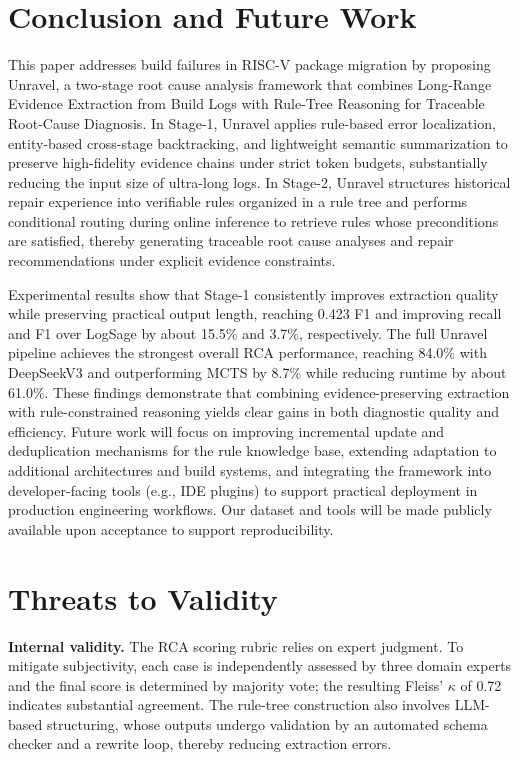 \documentclass[sigconf]{acmart}
\begin{document}
\section{Conclusion and Future Work}

This paper addresses build failures in RISC-V package migration by proposing Unravel, a two-stage root cause analysis framework that combines Long-Range Evidence Extraction from Build Logs with Rule-Tree Reasoning for Traceable Root-Cause Diagnosis. In Stage-1, Unravel applies rule-based error localization, entity-based cross-stage backtracking, and lightweight semantic summarization to preserve high-fidelity evidence chains under strict token budgets, substantially reducing the input size of ultra-long logs. In Stage-2, Unravel structures historical repair experience into verifiable rules organized in a rule tree and performs conditional routing during online inference to retrieve rules whose preconditions are satisfied, thereby generating traceable root cause analyses and repair recommendations under explicit evidence constraints.

Experimental results show that Stage-1 consistently improves extraction quality while preserving practical output length, reaching 0.423 F1 and improving recall and F1 over LogSage by about 15.5\% and 3.7\%, respectively. The full Unravel pipeline achieves the strongest overall RCA performance, reaching 84.0\% with DeepSeekV3 and outperforming MCTS by 8.7\% while reducing runtime by about 61.0\%. These findings demonstrate that combining evidence-preserving extraction with rule-constrained reasoning yields clear gains in both diagnostic quality and efficiency. Future work will focus on improving incremental update and deduplication mechanisms for the rule knowledge base, extending adaptation to additional architectures and build systems, and integrating the framework into developer-facing tools (e.g., IDE plugins) to support practical deployment in production engineering workflows. Our dataset and tools will be made publicly available upon acceptance to support reproducibility.

\section{Threats to Validity}

\textbf{Internal validity.} The RCA scoring rubric relies on expert judgment. To mitigate subjectivity, each case is independently assessed by three domain experts and the final score is determined by majority vote; the resulting Fleiss' $\kappa$ of 0.72 indicates substantial agreement. The rule-tree construction also involves LLM-based structuring, whose outputs undergo validation by an automated schema checker and a rewrite loop, thereby reducing extraction errors.
\end{document}
